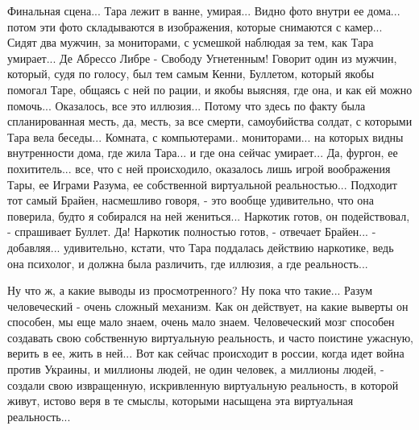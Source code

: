 Финальная сцена... Тара лежит в ванне, умирая... Видно фото внутри ее дома...
потом эти фото складываются в изображения, которые снимаются с камер... Сидят
два мужчин, за мониторами, с усмешкой наблюдая за тем, как Тара умирает... Де
Абрессо Либре - Свободу Угнетенным! Говорит один из мужчин, который, судя по
голосу, был тем самым Кенни, Буллетом, который якобы помогал Таре, общаясь с
ней по рации, и якобы выясняя, где она, и как ей можно помочь... Оказалось, все
это иллюзия... Потому что здесь по факту была спланированная месть, да, месть,
за все смерти, самоубийства солдат, с которыми Тара вела беседы...  Комната, с
компьютерами.. мониторами... на которых видны внутренности дома, где жила
Тара...  и где она сейчас умирает... Да, фургон, ее похититель... все, что с
ней происходило, оказалось лишь игрой воображения Тары, ее Играми Разума, ее
собственной виртуальной реальностью...  Подходит тот самый Брайен, насмешливо
говоря, - это вообще удивительно, что она поверила, будто я собирался на ней
жениться... Наркотик готов, он подействовал, - спрашивает Буллет. Да! Наркотик
полностью готов, - отвечает Брайен... - добавляя... удивительно, кстати, что
Тара поддалась действию наркотике, ведь она психолог, и должна была различить,
где иллюзия, а где реальность... 

Ну что ж, а какие выводы из просмотренного? Ну пока что такие...  Разум
человеческий - очень сложный механизм.  Как он действует, на какие выверты он
способен, мы еще мало знаем, очень мало знаем. Человеческий мозг способен
создавать свою собственную виртуальную реальность, и часто поистине ужасную,
верить в ее, жить в ней... Вот как сейчас происходит в россии, когда идет война
против Украины, и миллионы людей, не один человек, а миллионы людей, - создали
свою извращенную, искривленную виртуальную реальность, в которой живут, истово
веря в те смыслы, которыми насыщена эта виртуальная реальность...




